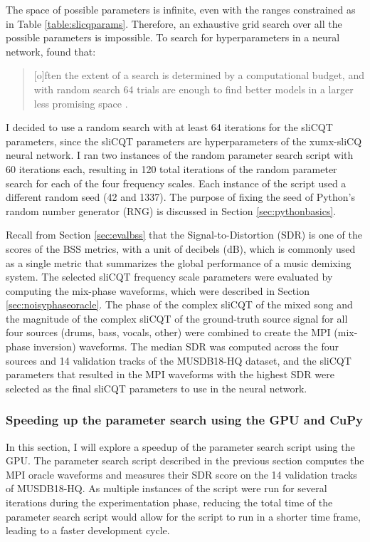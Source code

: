 \documentclass[report.tex]{subfiles}
\begin{document}
The space of possible parameters is infinite, even with the ranges constrained as in Table \ref{table:slicqparams}. Therefore, an exhaustive grid search over all the possible parameters is impossible. To search for hyperparameters in a neural network, \textcite{randomgrid} found that:

\begin{quote}
	[o]ften the extent of a search is determined by a computational budget, and with random search 64 trials are enough to find better models in a larger less promising space \parencite[293]{randomgrid}.
\end{quote}

I decided to use a random search with at least 64 iterations for the sliCQT parameters, since the sliCQT parameters are hyperparameters of the xumx-sliCQ neural network. I ran two instances of the random parameter search script with 60 iterations each, resulting in 120 total iterations of the random parameter search for each of the four frequency scales. Each instance of the script used a different random seed (42 and 1337). The purpose of fixing the seed of Python's random number generator (RNG) is discussed in Section \ref{sec:pythonbasics}.

Recall from Section \ref{sec:evalbss} that the Signal-to-Distortion (SDR) is one of the scores of the BSS metrics, with a unit of decibels (dB), which is commonly used as a single metric that summarizes the global performance of a music demixing system. The selected sliCQT frequency scale parameters were evaluated by computing the mix-phase waveforms, which were described in Section \ref{sec:noisyphaseoracle}. The phase of the complex sliCQT of the mixed song and the magnitude of the complex sliCQT of the ground-truth source signal for all four sources (drums, bass, vocals, other) were combined to create the MPI (mix-phase inversion) waveforms. The median SDR was computed across the four sources and 14 validation tracks of the MUSDB18-HQ dataset, and the sliCQT parameters that resulted in the MPI waveforms with the highest SDR were selected as the final sliCQT parameters to use in the neural network.

\subsubsection{Speeding up the parameter search using the GPU and CuPy}
\label{sec:fasterbsscupy}

In this section, I will explore a speedup of the parameter search script using the GPU. The parameter search script described in the previous section computes the MPI oracle waveforms and measures their SDR score on the 14 validation tracks of MUSDB18-HQ. As multiple instances of the script were run for several iterations during the experimentation phase, reducing the total time of the parameter search script would allow for the script to run in a shorter time frame, leading to a faster development cycle.
\end{document}
